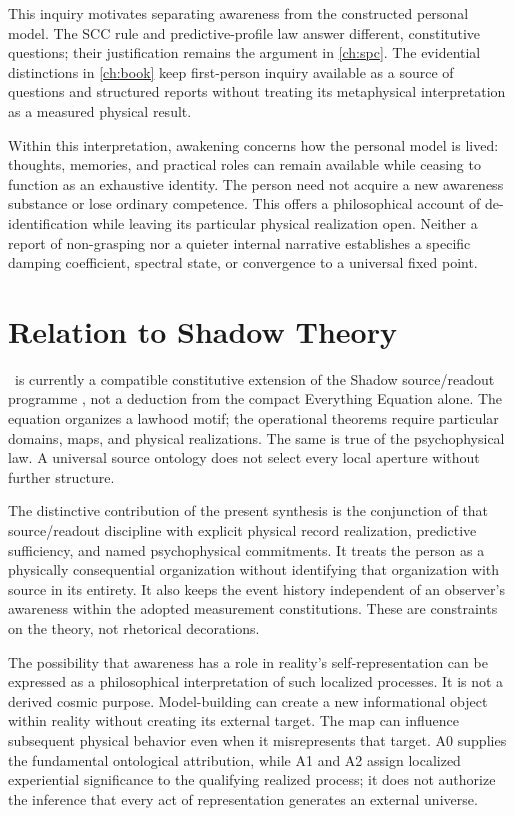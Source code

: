 This inquiry motivates separating awareness from the constructed personal model. The SCC rule and predictive-profile law answer different, constitutive questions; their justification remains the argument in \cref{ch:spc}. The evidential distinctions in \cref{ch:book} keep first-person inquiry available as a source of questions and structured reports without treating its metaphysical interpretation as a measured physical result.

Within this interpretation, awakening concerns how the personal model is lived: thoughts, memories, and practical roles can remain available while ceasing to function as an exhaustive identity. The person need not acquire a new awareness substance or lose ordinary competence. This offers a philosophical account of de-identification while leaving its particular physical realization open. Neither a report of non-grasping nor a quieter internal narrative establishes a specific damping coefficient, spectral state, or convergence to a universal fixed point.

\section{Relation to Shadow Theory}\label{section:resolution:relation-to-shadow-theory}
\spctwo\ is currently a compatible constitutive extension of the Shadow source/readout programme \cite{RodgersFramework2026}, not a deduction from the compact Everything Equation alone. The equation organizes a lawhood motif; the operational theorems require particular domains, maps, and physical realizations. The same is true of the psychophysical law. A universal source ontology does not select every local aperture without further structure.

The distinctive contribution of the present synthesis is the conjunction of that source/readout discipline with explicit physical record realization, predictive sufficiency, and named psychophysical commitments. It treats the person as a physically consequential organization without identifying that organization with source in its entirety. It also keeps the event history independent of an observer's awareness within the adopted measurement constitutions. These are constraints on the theory, not rhetorical decorations.

The possibility that awareness has a role in reality's self-representation can be expressed as a philosophical interpretation of such localized processes. It is not a derived cosmic purpose. Model-building can create a new informational object within reality without creating its external target. The map can influence subsequent physical behavior even when it misrepresents that target. A0 supplies the fundamental ontological attribution, while A1 and A2 assign localized experiential significance to the qualifying realized process; it does not authorize the inference that every act of representation generates an external universe.

